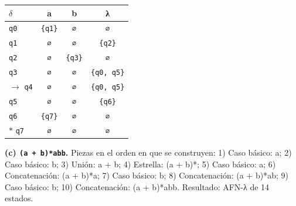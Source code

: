\documentclass[11pt]{article}
\begin{document}
\begin{center}\small\begin{tabular}{lccc}\toprule
$\delta$ & a & b & λ \\\midrule
 \texttt{q0} & \texttt{\{q1\}} & \texttt{∅} & \texttt{∅} \\
 \texttt{q1} & \texttt{∅} & \texttt{∅} & \texttt{\{q2\}} \\
 \texttt{q2} & \texttt{∅} & \texttt{\{q3\}} & \texttt{∅} \\
 \texttt{q3} & \texttt{∅} & \texttt{∅} & \texttt{\{q0, q5\}} \\
$\to$ \texttt{q4} & \texttt{∅} & \texttt{∅} & \texttt{\{q0, q5\}} \\
 \texttt{q5} & \texttt{∅} & \texttt{∅} & \texttt{\{q6\}} \\
 \texttt{q6} & \texttt{\{q7\}} & \texttt{∅} & \texttt{∅} \\
$*$ \texttt{q7} & \texttt{∅} & \texttt{∅} & \texttt{∅} \\
\bottomrule\end{tabular}\end{center}
\textbf{(c) \texttt{(a + b)*abb}.} Piezas en el orden en que se construyen: 1) Caso básico: a; 2) Caso básico: b; 3) Unión: a + b; 4) Estrella: (a + b)*; 5) Caso básico: a; 6) Concatenación: (a + b)*a; 7) Caso básico: b; 8) Concatenación: (a + b)*ab; 9) Caso básico: b; 10) Concatenación: (a + b)*abb. Resultado: AFN-λ de 14 estados.
\end{document}
